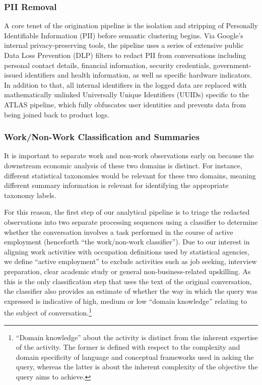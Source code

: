 \documentclass[11pt,a4paper]{article}
\begin{document}
\subsubsection{PII Removal}
A core tenet of the origination pipeline is the isolation and stripping of Personally Identifiable Information (PII) before semantic clustering begins. Via Google’s internal privacy-preserving tools, the pipeline uses a series of extensive public Data Loss Prevention (DLP) filters to redact PII from conversations including personal contact details, financial information, security credentials, government-issued identifiers and health information, as well as specific hardware indicators. In addition to that, all internal identifiers in the logged data are replaced with mathematically unlinked Universally Unique Identifiers (UUIDs) specific to the ATLAS pipeline, which fully obfuscates user identities and prevents data from being joined back to product logs.

\subsubsection{Work/Non-Work Classification and Summaries}
It is important to separate work and non-work observations early on because the downstream economic analysis of these two domains is distinct. For instance, different statistical taxonomies would be relevant for these two domains, meaning different summary information is relevant for identifying the appropriate taxonomy labels.

For this reason, the first step of our analytical pipeline is to triage the redacted observations into two separate processing sequences using a classifier to determine whether the conversation involves a task performed in the course of active employment (henceforth ``the work/non-work classifier''). Due to our interest in aligning work activities with occupation definitions used by statistical agencies, we define ``active employment'' to exclude activities such as job seeking, interview preparation, clear academic study or general non-business-related upskilling. As this is the only classification step that uses the text of the original conversation, the classifier also provides an estimate of whether the way in which the query was expressed is indicative of high, medium or low ``domain knowledge'' relating to the subject of conversation.\footnote{``Domain knowledge'' about the activity is distinct from the inherent expertise of the activity. The former is defined with respect to the complexity and domain specificity of language and conceptual frameworks used in asking the query, whereas the latter is about the inherent complexity of the objective the query aims to achieve.}
\end{document}
